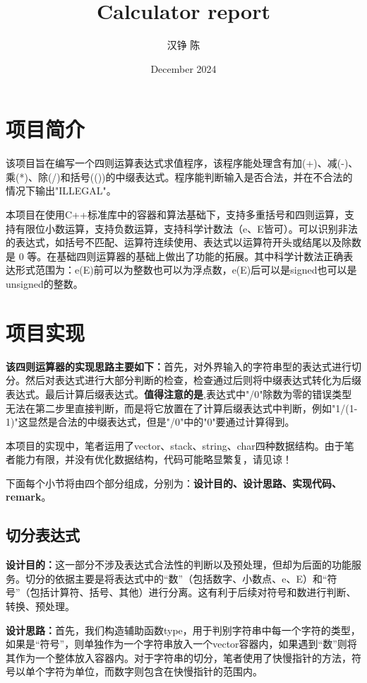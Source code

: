 \documentclass[fontset=fandol]{ctexart}
\title{\textbf{Calculator report}}
\author{汉铮 陈}
\date{December  2024}
\begin{document}
\maketitle

\section{项目简介}
该项目旨在编写一个四则运算表达式求值程序，该程序能处理含有加(+)、减(-)、乘(*)、除(/)和括号(())的中缀表达式。程序能判断输入是否合法，并在不合法的情况下输出"ILLEGAL"。

本项目在使用C++标准库中的容器和算法基础下，支持多重括号和四则运算，支持有限位小数运算，支持负数运算，支持科学计数法（e、E皆可）。可以识别非法的表达式，如括号不匹配、运算符连续使用、表达式以运算符开头或结尾以及除数是 0 等。在基础四则运算器的基础上做出了功能的拓展。其中科学计数法正确表达形式范围为：e(E)前可以为整数也可以为浮点数，e(E)后可以是signed也可以是unsigned的整数。

\section{项目实现}
\textbf{该四则运算器的实现思路主要如下：}首先，对外界输入的字符串型的表达式进行切分。然后对表达式进行大部分判断的检查，检查通过后则将中缀表达式转化为后缀表达式。最后计算后缀表达式。\textbf{值得注意的是},表达式中"/0"除数为零的错误类型无法在第二步里直接判断，而是将它放置在了计算后缀表达式中判断，例如"1/(1-1)"这显然是合法的中缀表达式，但是"/0"中的"0"要通过计算得到。

本项目的实现中，笔者运用了vector、stack、string、char四种数据结构。由于笔者能力有限，并没有优化数据结构，代码可能略显繁复，请见谅！

下面每个小节将由四个部分组成，分别为：\textbf{设计目的、设计思路、实现代码、remark}。

\subsection{切分表达式}
\textbf{设计目的：}这一部分不涉及表达式合法性的判断以及预处理，但却为后面的功能服务。切分的依据主要是将表达式中的“数”（包括数字、小数点、e、E）和“符号”（包括计算符、括号、其他）进行分离。这有利于后续对符号和数进行判断、转换、预处理。

\textbf{设计思路：}首先，我们构造辅助函数type，用于判别字符串中每一个字符的类型，如果是“符号”，则单独作为一个字符串放入一个vector容器内，如果遇到“数”则将其作为一个整体放入容器内。对于字符串的切分，笔者使用了快慢指针的方法，符号以单个字符为单位，而数字则包含在快慢指针的范围内。
\end{document}
